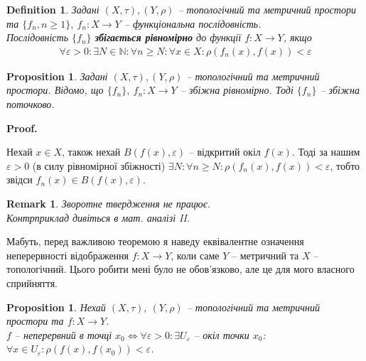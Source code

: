 \documentclass[a4paper, 10pt]{article}
\makeatletter
\theoremstyle{theoremdd}
\newtheorem{definition}[theorem]{Definition}
\newtheorem{proposition}[theorem]{Proposition}
\newtheorem{remark}[theorem]{Remark}
\renewenvironment{proof}[1][Proof.\\]{\par
\pushQED{\hfill \qed}%
\normalfont \topsep6\p@\@plus6\p@\relax
\trivlist
\item\relax
{\bfseries
#1\@addpunct{.}}\hspace\labelsep\ignorespaces
}{%
\popQED\endtrivlist\@endpefalse
}
\makeatother
\begin{document}
\begin{definition}
Задані $(X,\tau), (Y,\rho)$ -- топологічний та метричний простори та $\{f_n, n \geq 1\},\ f_n \colon X \to Y$ -- функціональна послідовність.\\
Послідовність $\{f_n\}$ \textbf{збігається рівномірно} до функції $f \colon X \to Y$, якщо
\begin{align*}
\forall \varepsilon > 0: \exists N \in \mathbb{N}: \forall n \geq N: \forall x \in X: \rho(f_n(x), f(x)) < \varepsilon
\end{align*}
\end{definition}

\begin{proposition}
Задані $(X,\tau), (Y,\rho)$ -- топологічний та метричний простори. Відомо, що $\{f_n\},\ f_n \colon X \to Y$ -- збіжна рівномірно. Тоді $\{f_n\}$ -- збіжна поточково.
\end{proposition}

\begin{proof}
Нехай $x \in X$, також нехай $B(f(x),\varepsilon)$ -- відкритий окіл $f(x)$. Тоді за нашим $\varepsilon > 0$ (в силу рівномірної збіжності) $\exists N: \forall n \geq N: \rho(f_n(x),f(x)) < \varepsilon$, тобто звідси $f_n(x) \in B(f(x),\varepsilon)$.
\end{proof}

\begin{remark}
Зворотне твердження не працює.\\
\textit{Контрприклад дивіться в мат. аналізі II}.
\end{remark}

\noindent
Мабуть, перед важливою теоремою я наведу еквівалентне означення неперервності відображення $f \colon X \to Y$, коли саме $Y$ -- метричний та $X$ -- топологічний. Цього робити мені було не обов'язково, але це для мого власного сприйняття.

\begin{proposition}
Нехай $(X,\tau),\ (Y,\rho)$ -- топологічний та метричний простори та $f \colon X \to Y$.\\
$f$ -- неперервний в точці $x_0 \iff \forall \varepsilon > 0: \exists U_\varepsilon$ -- окіл точки $x_0$: $\forall x \in U_\varepsilon: \rho(f(x), f(x_0)) < \varepsilon$.
\end{proposition}
\end{document}

